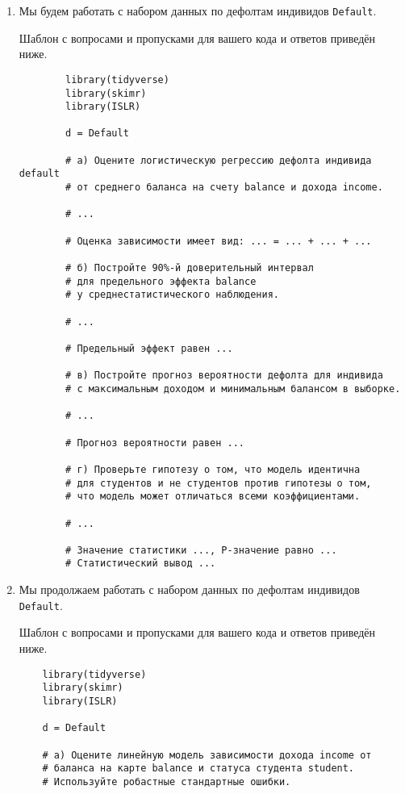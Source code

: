 \documentclass[12pt]{article}
\begin{document}
\begin{enumerate}
\newpage
    \item Мы будем работать с набором данных по дефолтам индивидов \verb|Default|.

    Шаблон с вопросами и пропусками для вашего кода и ответов приведён ниже. 

    \begin{verbatim}
        library(tidyverse)
        library(skimr)
        library(ISLR)

        d = Default

        # а) Оцените логистическую регрессию дефолта индивида default 
        # от среднего баланса на счету balance и дохода income. 

        # ...

        # Оценка зависимости имеет вид: ... = ... + ... + ...  

        # б) Постройте 90%-й доверительный интервал 
        # для предельного эффекта balance 
        # у среднестатистического наблюдения. 

        # ...

        # Предельный эффект равен ...

        # в) Постройте прогноз вероятности дефолта для индивида 
        # с максимальным доходом и минимальным балансом в выборке.

        # ...

        # Прогноз вероятности равен ...

        # г) Проверьте гипотезу о том, что модель идентична 
        # для студентов и не студентов против гипотезы о том,
        # что модель может отличаться всеми коэффициентами. 

        # ...

        # Значение статистики ..., P-значение равно ... 
        # Статистический вывод ...

    \end{verbatim}

    \newpage
    \item Мы продолжаем работать с набором данных по дефолтам индивидов \verb|Default|.

    Шаблон с вопросами и пропусками для вашего кода и ответов приведён ниже. 

\begin{verbatim}
    library(tidyverse)
    library(skimr)
    library(ISLR)

    d = Default

    # а) Оцените линейную модель зависимости дохода income от
    # баланса на карте balance и статуса студента student. 
    # Используйте робастные стандартные ошибки. 


\end{verbatim}
\end{enumerate}
\end{document}
